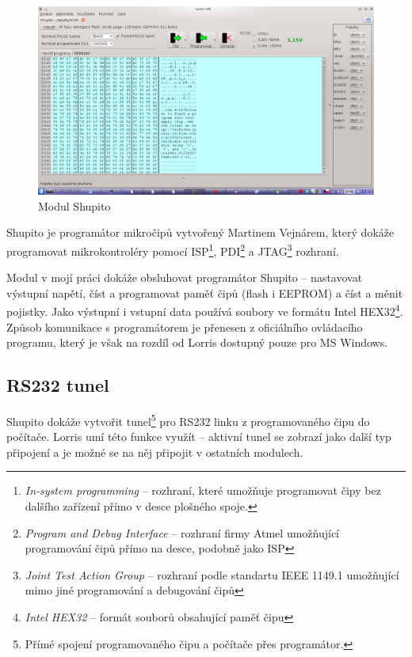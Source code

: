 \documentclass[12pt, a4paper, oneside]{article}
\newcommand{\It}{\textit}  %
\begin{document}
\begin{figure}[h]
\begin{center}
\includegraphics[width=\textwidth]{img/shupito.png}
\caption{Modul Shupito}
\label{Shupito}
\end{center}
\end{figure}
Shupito je programátor mikročipů vytvořený Martinem Vejnárem, který dokáže programovat mikrokontroléry pomocí ISP\footnote{\It{In-system programming} -- rozhraní, které umožňuje programovat čipy bez dalšího zařízení přímo v desce plošného spoje.}, PDI\footnote{\It{Program and Debug Interface} -- rozhraní firmy Atmel umožňující programování čipů přímo na desce, podobně jako ISP} a JTAG\footnote{\It{Joint Test Action Group} -- rozhraní podle standartu IEEE 1149.1 umožňující mimo jiné programování a debugování čipů} rozhraní. 

Modul v mojí práci dokáže obsluhovat programátor Shupito -- nastavovat výstupní napětí, číst a programovat paměť čipů (flash i EEPROM) a číst a měnit pojistky. Jako výstupní i vstupní data používá soubory ve formátu Intel HEX32\footnote{\It{Intel HEX32} -- formát souborů obsahující paměť čipu}. 
Způsob komunikace s programátorem je přenesen z oficiálního ovládacího programu\cite{avr232client}, který je však na rozdíl od Lorris dostupný pouze pro MS Windows.

\subsection{RS232 tunel}
\label{tunel}
Shupito dokáže vytvořit tunel\footnote{Přímé spojení programovaného čipu a počítače přes programátor.} pro RS232 linku z programovaného čipu do počítače. Lorris umí této funkce využít -- aktivní tunel se zobrazí jako další typ připojení a je možné se na něj připojit v ostatních modulech.
\end{document}
